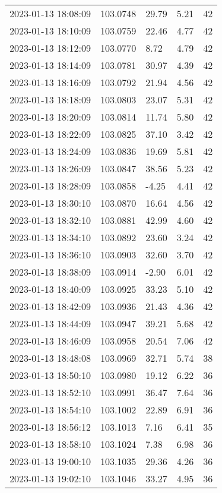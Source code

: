 \documentclass{nature_plusfigure}
\begin{document}
\begin{supplement}
\begin{center}
\begin{longtable}{lllll}
2023-01-13 18:08:09 & 103.0748 & 29.79 & 5.21 & 42 \\ 
2023-01-13 18:10:09 & 103.0759 & 22.46 & 4.77 & 42 \\ 
2023-01-13 18:12:09 & 103.0770 & 8.72 & 4.79 & 42 \\ 
2023-01-13 18:14:09 & 103.0781 & 30.97 & 4.39 & 42 \\ 
2023-01-13 18:16:09 & 103.0792 & 21.94 & 4.56 & 42 \\ 
2023-01-13 18:18:09 & 103.0803 & 23.07 & 5.31 & 42 \\ 
2023-01-13 18:20:09 & 103.0814 & 11.74 & 5.80 & 42 \\ 
2023-01-13 18:22:09 & 103.0825 & 37.10 & 3.42 & 42 \\ 
2023-01-13 18:24:09 & 103.0836 & 19.69 & 5.81 & 42 \\ 
2023-01-13 18:26:09 & 103.0847 & 38.56 & 5.23 & 42 \\ 
2023-01-13 18:28:09 & 103.0858 & -4.25 & 4.41 & 42 \\ 
2023-01-13 18:30:10 & 103.0870 & 16.64 & 4.56 & 42 \\ 
2023-01-13 18:32:10 & 103.0881 & 42.99 & 4.60 & 42 \\ 
2023-01-13 18:34:10 & 103.0892 & 23.60 & 3.24 & 42 \\ 
2023-01-13 18:36:10 & 103.0903 & 32.60 & 3.70 & 42 \\ 
2023-01-13 18:38:09 & 103.0914 & -2.90 & 6.01 & 42 \\ 
2023-01-13 18:40:09 & 103.0925 & 33.23 & 5.10 & 42 \\ 
2023-01-13 18:42:09 & 103.0936 & 21.43 & 4.36 & 42 \\ 
2023-01-13 18:44:09 & 103.0947 & 39.21 & 5.68 & 42 \\ 
2023-01-13 18:46:09 & 103.0958 & 20.54 & 7.06 & 42 \\ 
2023-01-13 18:48:08 & 103.0969 & 32.71 & 5.74 & 38 \\ 
2023-01-13 18:50:10 & 103.0980 & 19.12 & 6.22 & 36 \\ 
2023-01-13 18:52:10 & 103.0991 & 36.47 & 7.64 & 36 \\ 
2023-01-13 18:54:10 & 103.1002 & 22.89 & 6.91 & 36 \\ 
2023-01-13 18:56:12 & 103.1013 & 7.16 & 6.41 & 35 \\ 
2023-01-13 18:58:10 & 103.1024 & 7.38 & 6.98 & 36 \\ 
2023-01-13 19:00:10 & 103.1035 & 29.36 & 4.26 & 36 \\ 
2023-01-13 19:02:10 & 103.1046 & 33.27 & 4.95 & 36 \\ 

\end{longtable}
\end{center}
\end{supplement}
\end{document}
